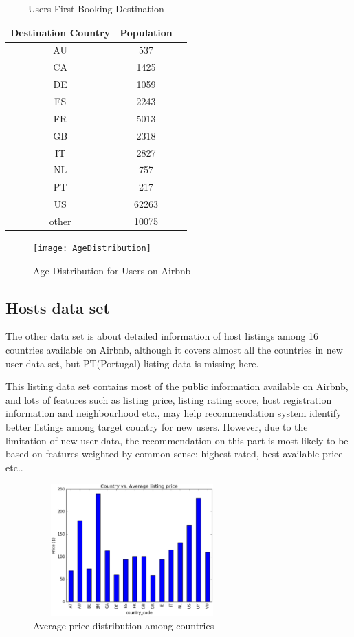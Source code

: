 \documentclass{sig-alternate-05-2015}
\begin{document}
\begin{table}[!htb]
\centering
\caption{Users First Booking Destination}
\label{table:destination}
\begin{tabular}{|c|c|l|} \hline
Destination Country & Population\\ \hline
AU & 537 \\ \hline
CA & 1425 \\ \hline
DE & 1059 \\ \hline
ES & 2243 \\ \hline
FR & 5013 \\ \hline
GB & 2318 \\ \hline
IT & 2827 \\ \hline
NL & 757 \\ \hline
PT & 217 \\ \hline
US &  62263 \\ \hline
other & 10075 \\
\hline\end{tabular}
\end{table}

\begin{figure}
\centering
\texttt{[image: AgeDistribution]}
\caption{Age Distribution for Users on Airbnb}
\label{fig:age distribution}
\end{figure}

\FloatBarrier
\subsection{Hosts data set}
The other data set is about detailed information of host listings among 16 countries available on Airbnb, although it covers almost all the countries in new user data set, but PT(Portugal) listing data is missing here.

This listing data set contains most of the public information available on Airbnb, and lots of features such as listing price, listing rating score, host registration information and neighbourhood etc., may help recommendation system identify better listings among target country for new users. However, due to the limitation of new user data, the recommendation on this part is most likely to be based on features weighted by common sense: highest rated, best available price etc..

\begin{figure}
\centering
\includegraphics[height=2in, width=3in]{country-avgPrice}
\caption{Average price distribution among countries}
\end{figure}
\end{document}
